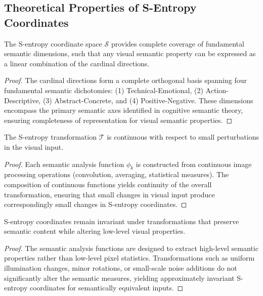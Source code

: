 \subsection{Theoretical Properties of S-Entropy Coordinates}

\begin{theorem}
The S-entropy coordinate space $\mathcal{S}$ provides complete coverage of fundamental semantic dimensions, such that any visual semantic property can be expressed as a linear combination of the cardinal directions.
\end{theorem}

\begin{proof}
The cardinal directions form a complete orthogonal basis spanning four fundamental semantic dichotomies: (1) Technical-Emotional, (2) Action-Descriptive, (3) Abstract-Concrete, and (4) Positive-Negative. These dimensions encompass the primary semantic axes identified in cognitive semantic theory, ensuring completeness of representation for visual semantic properties.
\end{proof}

\begin{theorem}
The S-entropy transformation $\mathcal{T}$ is continuous with respect to small perturbations in the visual input.
\end{theorem}

\begin{proof}
Each semantic analysis function $\phi_k$ is constructed from continuous image processing operations (convolution, averaging, statistical measures). The composition of continuous functions yields continuity of the overall transformation, ensuring that small changes in visual input produce correspondingly small changes in S-entropy coordinates.
\end{proof}

\begin{theorem}
S-entropy coordinates remain invariant under transformations that preserve semantic content while altering low-level visual properties.
\end{theorem}

\begin{proof}
The semantic analysis functions are designed to extract high-level semantic properties rather than low-level pixel statistics. Transformations such as uniform illumination changes, minor rotations, or small-scale noise additions do not significantly alter the semantic measures, yielding approximately invariant S-entropy coordinates for semantically equivalent inputs.
\end{proof}

